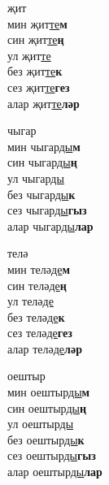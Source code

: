 \begin{multicols}{4}
\begin{enumerate}
\begin{minipage}{\linewidth}
    \item
    җит\\
    мин җит\underline{те}\textbf{м}\\
    син җит\underline{те}\textbf{ң}\\
    ул җит\underline{те}\\
    без җит\underline{те}\textbf{к}\\
    сез җит\underline{те}\textbf{гез}\\
    алар җит\underline{те}\textbf{ләр}\\
\end{minipage}

\begin{minipage}{\linewidth}
    \item
    чыгар\\
    мин чыгар\underline{ды}\textbf{м}\\
    син чыгар\underline{ды}\textbf{ң}\\
    ул чыгар\underline{ды}\\
    без чыгар\underline{ды}\textbf{к}\\
    сез чыгар\underline{ды}\textbf{гыз}\\
    алар чыгар\underline{ды}\textbf{лар}\\
\end{minipage}

\begin{minipage}{\linewidth}
    \item
    телә\\
    мин телә\underline{де}\textbf{м}\\
    син телә\underline{де}\textbf{ң}\\
    ул телә\underline{де}\\
    без телә\underline{де}\textbf{к}\\
    сез телә\underline{де}\textbf{гез}\\
    алар телә\underline{де}\textbf{ләр}\\
\end{minipage}

\begin{minipage}{\linewidth}
    \item
    оештыр\\
    мин оештыр\underline{ды}\textbf{м}\\
    син оештыр\underline{ды}\textbf{ң}\\
    ул оештыр\underline{ды}\\
    без оештыр\underline{ды}\textbf{к}\\
    сез оештыр\underline{ды}\textbf{гыз}\\
    алар оештыр\underline{ды}\textbf{лар}\\
\end{minipage}


\end{enumerate}
\end{multicols}
